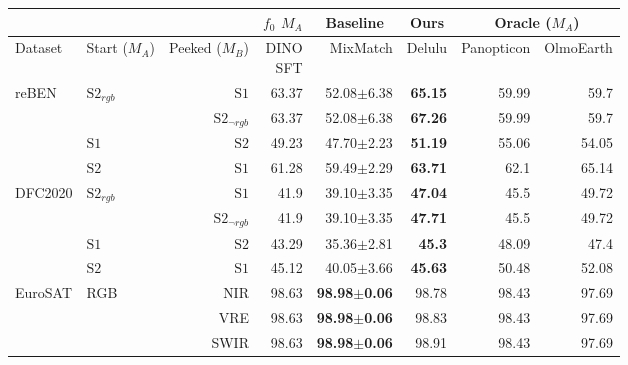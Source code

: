 \begin{tabular}{llr | r | rr | rr}
\toprule
\multicolumn{3}{c}{} & \multicolumn{1}{c|}{$f_0$ $M_A$} & \multicolumn{1}{c|}{Baseline} & \multicolumn{1}{c|}{Ours} & \multicolumn{2}{c}{Oracle ($M_A$)} \\
\midrule
Dataset & \shortstack[c]{Start\\($M_A$)} & \shortstack[c]{Peeked\\($M_B$)} & \shortstack[c]{DINO\\SFT} & MixMatch & Delulu & Panopticon & OlmoEarth \\
\midrule
  \multirow{4}{*}{reBEN} & \multirow{2}{*}{$\mathrm{S2}_{rgb}$} & $\mathrm{S1}$ & 63.37 & 52.08$\pm$6.38 & \textbf{65.15} & 59.99 & 59.7 \\
   &  & $\mathrm{S2}_{\neg rgb}$ & 63.37 & 52.08$\pm$6.38 & \textbf{67.26} & 59.99 & 59.7 \\
   & $\mathrm{S1}$ & $\mathrm{S2}$ & 49.23 & 47.70$\pm$2.23 & \textbf{51.19} & 55.06 & 54.05 \\
   & $\mathrm{S2}$ & $\mathrm{S1}$ & 61.28 & 59.49$\pm$2.29 & \textbf{63.71} & 62.1 & 65.14 \\
  \midrule
  \multirow{4}{*}{DFC2020} & \multirow{2}{*}{$\mathrm{S2}_{rgb}$} & $\mathrm{S1}$ & 41.9 & 39.10$\pm$3.35 & \textbf{47.04} & 45.5 & 49.72 \\
   &  & $\mathrm{S2}_{\neg rgb}$ & 41.9 & 39.10$\pm$3.35 & \textbf{47.71} & 45.5 & 49.72 \\
   & $\mathrm{S1}$ & $\mathrm{S2}$ & 43.29 & 35.36$\pm$2.81 & \textbf{45.3} & 48.09 & 47.4 \\
   & $\mathrm{S2}$ & $\mathrm{S1}$ & 45.12 & 40.05$\pm$3.66 & \textbf{45.63} & 50.48 & 52.08 \\
  \midrule
  \multirow{3}{*}{EuroSAT} & \multirow{3}{*}{RGB} & NIR & 98.63 & \textbf{98.98$\pm$0.06} & 98.78 & 98.43 & 97.69 \\
   &  & VRE & 98.63 & \textbf{98.98$\pm$0.06} & 98.83 & 98.43 & 97.69 \\
   &  & SWIR & 98.63 & \textbf{98.98$\pm$0.06} & 98.91 & 98.43 & 97.69 \\
\bottomrule
\end{tabular}
